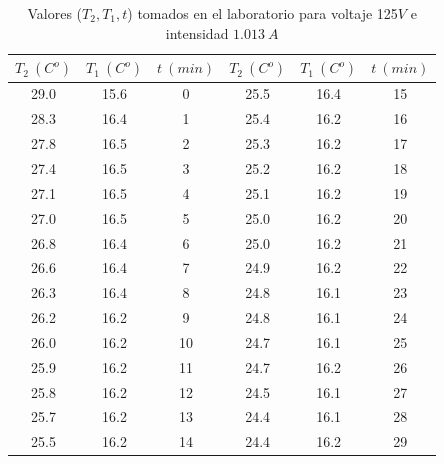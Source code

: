 \documentclass[12pt,a4paper]{article}
\begin{document}
\begin{table}[h!] 	 \centering 
\begin{tabular}{|c|c|c||c|c|c|} 
\hline 
$T_2 \ (C^o)$ & $T_1 \ (C^o) $ & $t \ (min)$ & $T_2 \ (C^o)$ & $T_1 \ (C^o) $ & $t \ (min)$ \\ \hline 
29.0 &  15.6 & 0 & 25.5 & 16.4 & 15 \\ 
28.3 &  16.4 & 1 & 25.4 & 16.2 & 16 \\ 
27.8 &  16.5 & 2 & 25.3 & 16.2 & 17 \\ 
27.4 &  16.5 & 3 & 25.2 & 16.2 & 18 \\ 
27.1 &  16.5 & 4 & 25.1 & 16.2 & 19 \\ 
27.0 &  16.5 & 5 & 25.0 & 16.2 & 20 \\ 
26.8 &  16.4 & 6 & 25.0 & 16.2 & 21 \\ 
26.6 &  16.4 & 7 & 24.9 & 16.2 & 22 \\ 
26.3 &  16.4 & 8 & 24.8 & 16.1 & 23 \\ 
26.2 &  16.2 & 9 & 24.8 & 16.1 & 24 \\ 
26.0 &  16.2 & 10 & 24.7 & 16.1 & 25 \\ 
25.9 &  16.2 & 11 & 24.7 & 16.2 & 26 \\ 
25.8 &  16.2 & 12 & 24.5 & 16.1 & 27 \\ 
25.7 &  16.2 & 13 & 24.4 & 16.1 & 28 \\ 
25.5 &  16.2 & 14 & 24.4 & 16.2 & 29 \\ 
\hline 
\end{tabular} 
\caption{Valores ($T_2,T_1,t$) tomados en el laboratorio para voltaje 125$V$ e intensidad $1.013 \ A$} 
\label{tab:} 
\end{table} 
\end{document}
